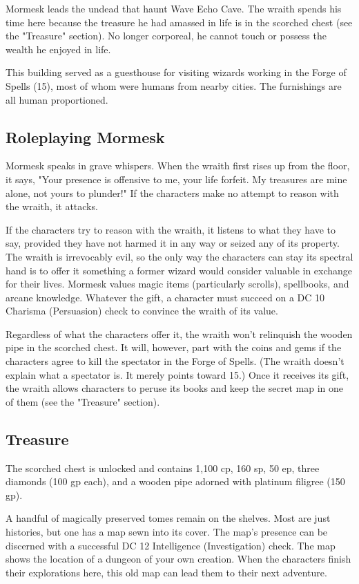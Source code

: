 \documentclass[10pt,a4paper,twoside,bg=print,twocolumn,openany,nodeprecatedcode]{dndbook}
\begin{document}
Mormesk leads the undead that haunt Wave Echo Cave. The wraith spends his time here because the treasure he had amassed in life is in the scorched chest (see the "Treasure" section). No longer corporeal, he cannot touch or possess the wealth he enjoyed in life.

This building served as a guesthouse for visiting wizards working in the Forge of Spells (15), most of whom were humans from nearby cities. The furnishings are all human proportioned.

\subsection{Roleplaying Mormesk}
Mormesk speaks in grave whispers. When the wraith first rises up from the floor, it says, "Your presence is offensive to me, your life forfeit. My treasures are mine alone, not yours to plunder!" If the characters make no attempt to reason with the wraith, it attacks.

If the characters try to reason with the wraith, it listens to what they have to say, provided they have not harmed it in any way or seized any of its property. The wraith is irrevocably evil, so the only way the characters can stay its spectral hand is to offer it something a former wizard would consider valuable in exchange for their lives. Mormesk values magic items (particularly scrolls), spellbooks, and arcane knowledge. Whatever the gift, a character must succeed on a DC 10 Charisma (Persuasion) check to convince the wraith of its value.

Regardless of what the characters offer it, the wraith won't relinquish the wooden pipe in the scorched chest. It will, however, part with the coins and gems if the characters agree to kill the spectator in the Forge of Spells. (The wraith doesn't explain what a spectator is. It merely points toward 15.) Once it receives its gift, the wraith allows characters to peruse its books and keep the secret map in one of them (see the "Treasure" section).

\subsection{Treasure}
The scorched chest is unlocked and contains 1,100 cp, 160 sp, 50 ep, three diamonds (100 gp each), and a wooden pipe adorned with platinum filigree (150 gp).

A handful of magically preserved tomes remain on the shelves. Most are just histories, but one has a map sewn into its cover. The map's presence can be discerned with a successful DC 12 Intelligence (Investigation) check. The map shows the location of a dungeon of your own creation. When the characters finish their explorations here, this old map can lead them to their next adventure.
\end{document}
